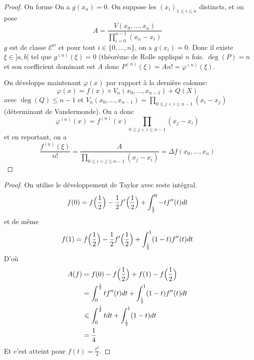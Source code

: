 \begin{proof}
	On forme 
	On a $g(x_{n})=0$. On suppose les $(x_{i})_{1\leqslant i\leqslant n}$ distincts, et on pose 
	\begin{equation}A=\frac{V(x_{0},\dots,x_{n})}{\prod_{i=0}^{n-1}(x_{n}-x_{i})}\end{equation}
	$g$ est de classe $\mathcal{C}^{n}$ et pour tout $i\in\{0,\dots,n\}$, on a $g(x_{i})=0$.
	Donc il existe $\xi\in]a,b[$ tel que $g^{(n)}(\xi)=0$ (théorème de Rolle appliqué $n$ fois. $\deg(P)=n$ et son coefficient dominant est $A$ donc $P^{(n)}(\xi)=An!=\varphi^{(n)}(\xi)$.

	On développe maintenant $\varphi(x)$ par rapport à la dernière colonne:
	\begin{equation}\varphi(x)=f(x)\times V_{n}(x_{0},\dots,x_{n-1})+Q(X)\end{equation}
	avec $\deg(Q)\leqslant n-1$ et $V_{n}(x_{0},\dots,x_{n-1})=\prod_{0\leqslant j<i\leqslant n-1}(x_{i}-x_{j})$ (déterminant de Vandermonde). On a donc 
	\begin{equation}\varphi^{(n)}(x)=f^{(n)}(x)\prod_{0\leqslant j<i\leqslant n-1}(x_{j}-x_{i})\end{equation}
	et en reportant, on a 
	\begin{equation}\frac{f^{(n)}(\xi)}{n!}=\frac{A}{\prod_{0\leqslant i<j\leqslant n-1}(x_{j}-x_{i})}=\Delta f(x_{0},\dots,x_{n})\end{equation}
\end{proof}

\begin{proof}
	On utilise le développement de Taylor avec reste intégral.
	\begin{equation}f(0)=f\Bigl(\frac{1}{2}\Bigr)-\frac{1}{2}f'\Bigl(\frac{1}{2}\Bigr)+\int_{\frac{1}{2}}^{0}-tf''(t)dt\end{equation}
	et de même
	\begin{equation}f(1)=f\Bigl(\frac{1}{2}\Bigr)-\frac{1}{2}f'\Bigl(\frac{1}{2}\Bigr)+\int_{\frac{1}{2}}^{1}(1-t)f''(t)dt\end{equation}
	D'où
	\begin{align}
		A(f)
		&=f(0)-f\Bigl(\frac{1}{2}\Bigr)+f(1)-f\Bigl(\frac{1}{2}\Bigr)\\
		&=\int_{0}^{\frac{1}{2}}tf''(t)dt+\int_{\frac{1}{2}}^{1}(1-t)f''(t)dt\\
		&\leqslant\int_{0}^{\frac{1}{2}}tdt+\int_{\frac{1}{2}}^{1}(1-t)dt\\
		&=\frac{1}{4}
	\end{align}
	Et c'est atteint pour $f(t)=\frac{t^{2}}{4}$.
\end{proof}

